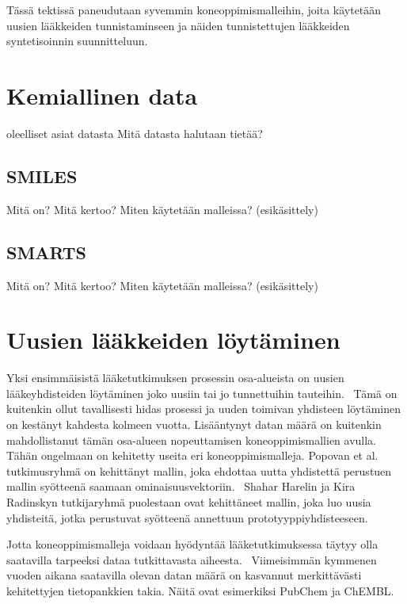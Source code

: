 \documentclass[finnish,twoside,censored,tkt,sw-line]{HYthesisML}
\begin{document}
Tässä tektissä paneudutaan syvemmin koneoppimismalleihin, joita käytetään uusien lääkkeiden tunnistaminseen ja näiden tunnistettujen lääkkeiden syntetisoinnin suunnitteluun.

\chapter{Kemiallinen data}

oleelliset asiat datasta
Mitä datasta halutaan tietää?

\section{SMILES}
Mitä on?
Mitä kertoo?
Miten käytetään malleissa? (esikäsittely)

\section{SMARTS}
Mitä on?
Mitä kertoo?
Miten käytetään malleissa? (esikäsittely)

\chapter{Uusien lääkkeiden löytäminen}


Yksi ensimmäisistä lääketutkimuksen prosessin osa-alueista on uusien lääkeyhdisteiden löytäminen joko uusiin tai jo tunnettuihin tauteihin.~\cite{EkinsSean2019Emlf}
Tämä on kuitenkin ollut tavallisesti hidas prosessi ja uuden toimivan yhdisteen löytäminen on kestänyt kahdesta kolmeen vuotta.
Lisääntynyt datan määrä on kuitenkin mahdollistanut tämän osa-alueen nopeuttamisen koneoppimismallien avulla.
Tähän ongelmaan on kehitetty useita eri koneoppimismalleja.
Popovan et al. tutkimusryhmä on kehittänyt mallin, joka ehdottaa uutta yhdistettä perustuen mallin syötteenä saamaan ominaisuusvektoriin.~\cite{PopovaMariya2018Drlf}
Shahar Harelin ja Kira Radinskyn tutkijaryhmä puolestaan ovat kehittäneet mallin, joka luo uusia yhdisteitä, jotka perustuvat syötteenä annettuun prototyyppiyhdisteeseen.~\cite{ShaharHarelAndKiraRadinsky}

Jotta koneoppimismalleja voidaan hyödyntää lääketutkimuksessa täytyy olla saatavilla tarpeeksi dataa tutkittavasta aiheesta.~\cite{EkinsSean2019Emlf}
Viimeisimmän kymmenen vuoden aikana saatavilla olevan datan määrä on kasvannut merkittävästi kehitettyjen tietopankkien takia.
Näitä ovat esimerkiksi PubChem ja ChEMBL.
\end{document}
